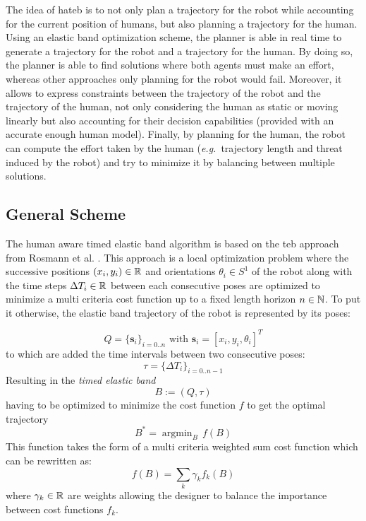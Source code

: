 \documentclass[a4paper,11pt,twoside]{StyleThese}
\begin{document}
The idea of \acrshort{hateb} is to not only plan a trajectory for the robot while accounting for the current position of humans, but also planning a trajectory for the human. Using an elastic band optimization scheme, the planner is able in real time to generate a trajectory for the robot and a trajectory for the human. By doing so, the planner is able to find solutions where both agents must make an effort, whereas other approaches only planning for the robot would fail. Moreover, it allows to express constraints between the trajectory of the robot and the trajectory of the human, not only considering the human as static or moving linearly but also accounting for their decision capabilities (provided with an accurate enough human model). Finally, by planning for the human, the robot can compute the effort taken by the human (\textit{e.g.}~trajectory length and threat induced by the robot) and try to minimize it by balancing between multiple solutions.

\subsection{General Scheme}
The human aware timed elastic band algorithm is based on the \acrfull{teb} approach from Rosmann et al. \cite{rosmann_efficient_2013}. This approach is a local optimization problem where the successive positions $(x_i, y_i) \in \mathbb{R}$ and orientations $\theta_i \in S^1$ of the robot along with the time steps $\Delta T_i \in \mathbb{R}$ between each consecutive poses are optimized to minimize a multi criteria cost function up to a fixed length horizon $n \in \mathbb{N}$. To put it otherwise, the elastic band trajectory of the robot is represented by its poses:

\[
Q = \{\textbf{s}_i\}_{i=0..n} \text{ with } \textbf{s}_i = [x_i, y_i, \theta_i]^T
\] to which are added the time intervals between two consecutive poses: \[\tau = \{\Delta T_i\}_{i=0..n-1}\] Resulting in the \textit{timed elastic band} \[B := (Q, \tau)\] having to be optimized to minimize the cost function $f$ to get the optimal trajectory \[B^* = \mathop{\mathrm{argmin}}_B\,f(B)\]
This function takes the form of a multi criteria weighted sum cost function which can be rewritten as: \[ f(B) = \sum_{k} \gamma_k f_k(B) \] where $\gamma_k \in \mathbb{R}$ are weights allowing the designer to balance the importance between cost functions $f_k$.
\end{document}
